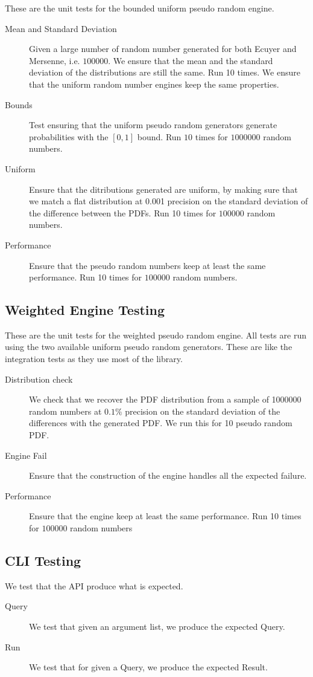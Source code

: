 \documentclass[12pt,a4paper,article]{memoir} %
\begin{document}
These are the unit tests for the bounded uniform pseudo random engine.
	
\begin{description}
	\item [Mean and Standard Deviation]
		Given a large number of random number generated for
		both Ecuyer and Mersenne, i.e. $100000$.
		We ensure that the mean and the standard deviation 
		of the distributions are still the same. Run 10 times.
		We ensure that the uniform random number engines keep
		the same properties.
	\item [Bounds]
		Test ensuring that the uniform pseudo random generators
		generate probabilities with the $[0, 1]$ bound.
		Run $10$ times for $1000000$ random numbers.
	\item [Uniform]
		Ensure that the ditributions generated are uniform,
		by making sure that we match a flat distribution at 0.001
		precision on the standard deviation of the difference
		between the PDFs.
		Run 10 times for $100000$ random numbers.
	\item [Performance]
		Ensure that the pseudo random numbers keep at
		least the same performance.
		Run 10 times for $100000$ random numbers.
\end{description}

\subsection{Weighted Engine Testing} 
These are the unit tests for the weighted pseudo random engine.
All tests are run using the two available uniform pseudo random
generators. 
These are like the integration tests as they use most of the library.
\begin{description}
	\item [Distribution check]
		We check that we recover the PDF distribution from
		a sample of 1000000 random numbers at $0.1\%$ precision
		on the standard deviation of the differences with the 
		generated PDF.
		We run this for 10 pseudo random PDF.
	\item [Engine Fail]
		Ensure that the construction of the engine 
		handles all the expected failure.
	\item [Performance]
		Ensure that the engine keep at least the same performance.
		Run 10 times for $100000$ random  numbers	
\end{description}	

\subsection{CLI Testing}
We test that the API produce what is expected.
\begin{description}
	\item [Query]
	We test that given an argument list, we produce the expected
	Query.
	\item[Run]
	We test that for given a Query, we produce the expected Result.
\end{description}
\end{document}
